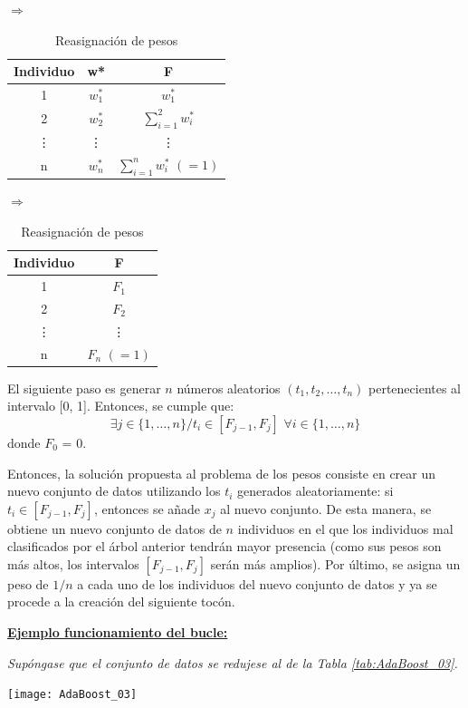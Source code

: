 \documentclass[12pt,twoside]{article}
\begin{document}
\begin{table}[h]
\centering
$\Rightarrow$
\begin{tabular}{|c|c|c|}
\hline
Individuo & w* & F\\ \hline
1 & $w_1^*$ & $w_1^*$ \\ \hline
2 & $w_2^*$ & $\displaystyle \sum_{i=1}^2 w_i^*$ \\ \hline
\vdots & \vdots & \vdots \\ \hline
n & $w_n^*$ & $\displaystyle \sum_{i=1}^n w_i^* \, \, (= 1)$ \\ \hline
\end{tabular}
$\Rightarrow$
\begin{tabular}{|c|c|}
\hline
Individuo & F \\ \hline
1 & $F_1$ \\ \hline
2 & $F_2$ \\ \hline
\vdots & \vdots \\ \hline
n & $F_n \, \, (=1)$ \\ \hline
\end{tabular}
\caption{Reasignación de pesos}
\label{tab:AdaB_pesos}
\end{table}

El siguiente paso es generar $n$ números aleatorios $(t_1, t_2, \dots, t_n)$ pertenecientes al intervalo [0, 1]. Entonces, se cumple que:
\begin{equation*}
\exists j \in \{1, \dots, n \} /t_i \in [F_{j-1}, F_{j}] \, \, \forall i \in \{1, \dots, n \}
\end{equation*}
donde $F_0$ = 0.

Entonces, la solución propuesta al problema de los pesos consiste en crear un nuevo conjunto de datos utilizando los $t_i$ generados aleatoriamente: si $t_i \in [F_{j-1}, F_{j}]$, entonces se añade $x_j$ al nuevo conjunto. De esta manera, se obtiene un nuevo conjunto de datos de $n$ individuos en el que los individuos mal clasificados por el árbol anterior tendrán mayor presencia (como sus pesos son más altos, los intervalos $[F_{j-1}, F_{j}]$ serán más amplios). Por último, se asigna un peso de $1/n$ a cada uno de los individuos del nuevo conjunto de datos y ya se procede a la creación del siguiente tocón.


\textbf{\underline{Ejemplo funcionamiento del bucle:}}

\textit{Supóngase que el conjunto de datos se redujese al de la Tabla \ref{tab:AdaBoost_03}.}
\begin{table}[H]
\centering
\texttt{[image: AdaBoost\_03]}
\caption{Submuestra del conjunto de datos para ilustrar el funcionamiento del bucle.}
\label{tab:AdaBoost_03}
\end{table}
\end{document}

